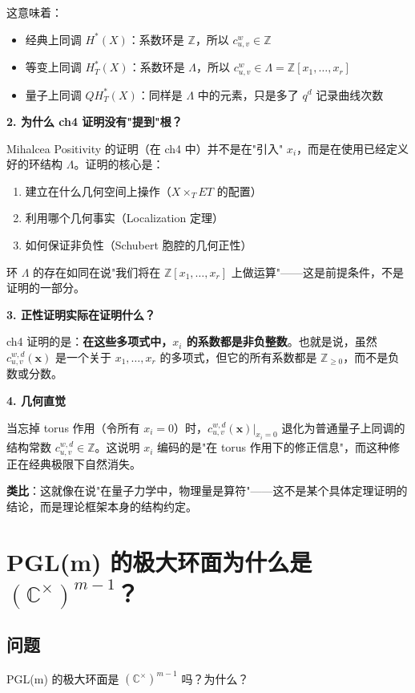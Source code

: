 这意味着：
\begin{itemize}
\item 经典上同调 $H^*(X)$：系数环是 $\mathbb{Z}$，所以 $c_{u,v}^w \in \mathbb{Z}$
\item 等变上同调 $H_T^*(X)$：系数环是 $\Lambda$，所以 $c_{u,v}^w \in \Lambda = \mathbb{Z}[x_1,\ldots,x_r]$
\item 量子上同调 $QH_T^*(X)$：同样是 $\Lambda$ 中的元素，只是多了 $q^d$ 记录曲线次数
\end{itemize}

\textbf{2. 为什么 ch4 证明没有"提到"根？}

Mihalcea Positivity 的证明（在 ch4 中）并不是在"引入" $x_i$，而是在使用已经定义好的环结构 $\Lambda$。证明的核心是：
\begin{enumerate}
\item 建立在什么几何空间上操作（$X \times_T ET$ 的配置）
\item 利用哪个几何事实（Localization 定理）
\item 如何保证非负性（Schubert 胞腔的几何正性）
\end{enumerate}

环 $\Lambda$ 的存在如同在说"我们将在 $\mathbb{Z}[x_1,\ldots,x_r]$ 上做运算"——这是前提条件，不是证明的一部分。

\textbf{3. 正性证明实际在证明什么？}

ch4 证明的是：\textbf{在这些多项式中，$x_i$ 的系数都是非负整数}。也就是说，虽然 $c_{u,v}^{w,d}(\mathbf{x})$ 是一个关于 $x_1,\ldots,x_r$ 的多项式，但它的所有系数都是 $\mathbb{Z}_{\geq 0}$，而不是负数或分数。

\textbf{4. 几何直觉}

当忘掉 torus 作用（令所有 $x_i = 0$）时，$c_{u,v}^{w,d}(\mathbf{x})|_{x_i=0}$ 退化为普通量子上同调的结构常数 $c_{u,v}^{w,d} \in \mathbb{Z}$。这说明 $x_i$ 编码的是"在 torus 作用下的修正信息"，而这种修正在经典极限下自然消失。

\textbf{类比}：这就像在说"在量子力学中，物理量是算符"——这不是某个具体定理证明的结论，而是理论框架本身的结构约定。

\section{PGL(m) 的极大环面为什么是 $(\mathbb{C}^{\times})^{m-1}$？}\label{sec:qa-PGL-maximal-torus}
\subsection{问题}
PGL(m) 的极大环面是 $(\mathbb{C}^{\times})^{m-1}$ 吗？为什么？
